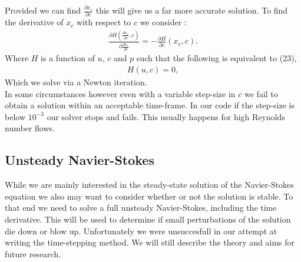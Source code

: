 \documentclass[11pt,twoside,a4paper]{article}
\begin{document}
Provided we can find $\frac{\partial x_c}{\partial c}$ this will give us a far more accurate solution.
To find the derivative of $x_c$ with respect to $c$ we consider :\\
\begin{align}
\frac{\partial H (\frac{\partial x_c}{\partial c},c)}{\partial \frac{\partial x_c}{\partial c}}  = - \frac{\partial H}{\partial c}(x_c,c) .
\end{align}
Where $H$ is a function of $u$, $c$ and $p$ such that the following is equivalent to (23),
\begin{align*}
H(u,c) = 0 ,
\end{align*}
Which we solve via a Newton iteration.\\
In some circumstances however even with a variable step-size in $c$ we fail to obtain a solution within an acceptable time-frame. In our code if the step-size is below $10^{-3}$ our solver stops and fails. This usually happens for high Reynolds number flows.

\subsection{Unsteady Navier-Stokes}

While we are mainly interested in the steady-state solution of the Navier-Stokes equation we also may want to consider whether or not the solution is stable. To that end we need to solve a full unsteady Navier-Stokes, including the time derivative. This will be used to determine if small perturbations of the solution die down or blow up. Unfortunately we were unsuccesfull in our attempt at writing the time-stepping method. We will still describe the theory and aims for future research.
\end{document}
